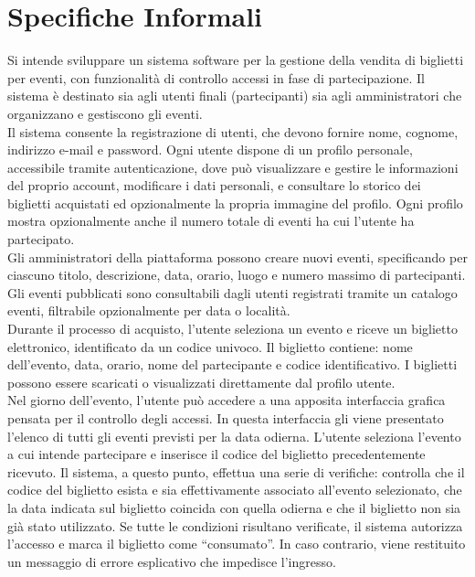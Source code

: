 \chapter{Specifiche Informali}
Si intende sviluppare un sistema software per la gestione della vendita di biglietti per eventi, con funzionalità di controllo accessi in fase di partecipazione. Il sistema è destinato sia agli utenti finali (partecipanti) sia agli amministratori che organizzano e gestiscono gli eventi.\\

\noindent Il sistema consente la registrazione di utenti, che devono fornire nome, cognome, indirizzo e-mail e password. Ogni utente dispone di un profilo personale, accessibile tramite autenticazione, dove può visualizzare e gestire le informazioni del proprio account, modificare i dati personali, e consultare lo storico dei biglietti acquistati ed opzionalmente la propria immagine del profilo. Ogni profilo mostra opzionalmente anche il numero totale di eventi ha cui l’utente ha partecipato.\\

\noindent Gli amministratori della piattaforma possono creare nuovi eventi, specificando per ciascuno titolo, descrizione, data, orario, luogo e numero massimo di partecipanti. Gli eventi pubblicati sono consultabili dagli utenti registrati tramite un catalogo eventi, filtrabile opzionalmente per data o località.\\

\noindent Durante il processo di acquisto, l’utente seleziona un evento e riceve un biglietto elettronico, identificato da un codice univoco. Il biglietto contiene: nome dell’evento, data, orario, nome del partecipante e codice identificativo. I biglietti possono essere scaricati o visualizzati direttamente dal profilo utente.\\

\noindent Nel giorno dell’evento, l’utente può accedere a una apposita interfaccia grafica pensata per il controllo degli accessi. In questa interfaccia gli viene presentato l’elenco di tutti gli eventi previsti per la data odierna. L’utente seleziona l’evento a cui intende partecipare e inserisce il codice del biglietto precedentemente ricevuto. Il sistema, a questo punto, effettua una serie di verifiche: controlla che il codice del biglietto esista e sia effettivamente associato all’evento selezionato, che la data indicata sul biglietto coincida con quella odierna e che il biglietto non sia già stato utilizzato. Se tutte le condizioni risultano verificate, il sistema autorizza l’accesso e marca il biglietto come “consumato”. In caso contrario, viene restituito un messaggio di errore esplicativo che impedisce l’ingresso.\\

